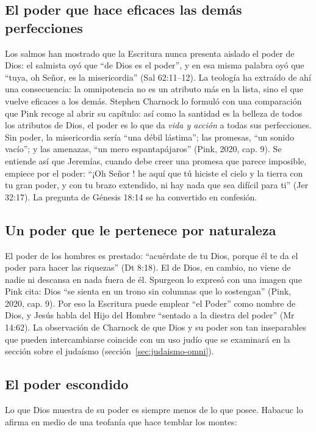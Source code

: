 \subsection{El poder que hace eficaces las demás perfecciones}
Los salmos han mostrado que la Escritura nunca presenta aislado el poder de Dios: el salmista oyó que ``de Dios es el poder'', y en esa misma palabra oyó que ``tuya, oh Señor, es la misericordia'' (Sal 62:11--12). La teología ha extraído de ahí una consecuencia: la omnipotencia no es un atributo más en la lista, sino el que vuelve eficaces a los demás. Stephen Charnock lo formuló con una comparación que Pink recoge al abrir su capítulo: así como la santidad es la belleza de todos los atributos de Dios, el poder es lo que da \emph{vida y acción} a todas sus perfecciones. Sin poder, la misericordia sería ``una débil lástima''; las promesas, ``un sonido vacío''; y las amenazas, ``un mero espantapájaros'' (Pink, 2020, cap. 9). Se entiende así que Jeremías, cuando debe creer una promesa que parece imposible, empiece por el poder: ``¡Oh Señor \SENOR! he aquí que tú hiciste el cielo y la tierra con tu gran poder, y con tu brazo extendido, ni hay nada que sea difícil para ti'' (Jer 32:17). La pregunta de Génesis 18:14 se ha convertido en confesión.

\subsection{Un poder que le pertenece por naturaleza}
El poder de los hombres es prestado: ``acuérdate de \SENOR{} tu Dios, porque él te da el poder para hacer las riquezas'' (Dt 8:18). El de Dios, en cambio, no viene de nadie ni descansa en nada fuera de él. Spurgeon lo expresó con una imagen que Pink cita: Dios ``se sienta en un trono sin columnas que lo sostengan'' (Pink, 2020, cap. 9). Por eso la Escritura puede emplear ``el Poder'' como nombre de Dios, y Jesús habla del Hijo del Hombre ``sentado a la diestra del poder'' (Mr 14:62). La observación de Charnock de que Dios y su poder son tan inseparables que pueden intercambiarse coincide con un uso judío que se examinará en la sección sobre el judaísmo (sección~\ref{sec:judaismo-omni}).

\subsection{El poder escondido}
Lo que Dios muestra de su poder es siempre menos de lo que posee. Habacuc lo afirma en medio de una teofanía que hace temblar los montes:

